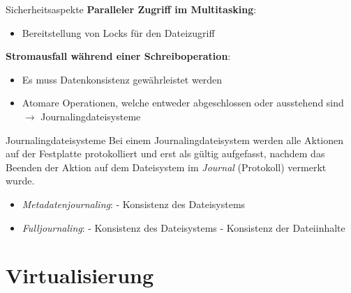 \documentclass[german]{spicker}
\begin{document}
\begin{bonus}{Sicherheitsaspekte}
    \textbf{Paralleler Zugriff im Multitasking}:
    \begin{itemize}
        \item Bereitstellung von Locks für den Dateizugriff
    \end{itemize}

    \textbf{Stromausfall während einer Schreiboperation}:
    \begin{itemize}
        \item Es muss Datenkonsistenz gewährleistet werden
        \item Atomare Operationen, welche entweder abgeschlossen oder ausstehend sind
              \subitem $\to$ Journalingdateisysteme
    \end{itemize}
\end{bonus}

\begin{defi}{Journalingdateisysteme}
    Bei einem Journalingdateisystem werden alle Aktionen auf der Festplatte protokolliert
    und erst als gültig aufgefasst, nachdem das Beenden der Aktion auf dem Dateisystem
    im \emph{Journal} (Protokoll) vermerkt wurde.

    \begin{itemize}
        \item \emph{Metadatenjournaling}:
              \subitem - Konsistenz des Dateisystems
        \item \emph{Fulljournaling}:
              \subitem - Konsistenz des Dateisystems
              \subitem - Konsistenz der Dateiinhalte
    \end{itemize}

\end{defi}

\section{Virtualisierung}
\end{document}
